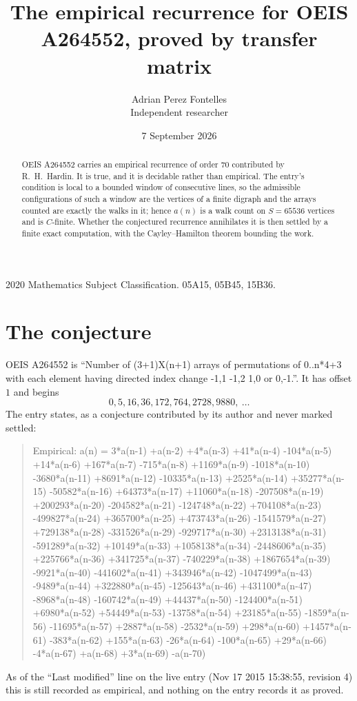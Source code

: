 \documentclass[11pt,a4paper]{article}
\title{The empirical recurrence for OEIS A264552, proved by transfer matrix}
\author{Adrian Perez Fontelles\\ \small Independent researcher}
\date{7 September 2026}
\theoremstyle{plain}
\theoremstyle{definition}
\begin{document}
\maketitle

\begin{abstract}
OEIS A264552 carries an empirical recurrence of order $70$ contributed by R.~H.~Hardin. It is
true, and it is decidable rather than empirical. The entry's condition is local to a bounded window of consecutive lines, so
the admissible configurations of such a window are the vertices of a finite digraph and the
arrays counted are exactly the walks in it; hence $a(n)$ is a walk count on $S=65536$ vertices
and is $C$-finite. Whether the conjectured recurrence annihilates it is then settled by a
finite exact computation, with the Cayley--Hamilton theorem bounding the work.
\end{abstract}

\noindent\small 2020 Mathematics Subject Classification. 05A15, 05B45, 15B36.\normalsize

\section{The conjecture}

OEIS A264552 is ``Number of (3+1)X(n+1) arrays of permutations of 0..n*4+3 with each element having directed index change -1,1 -1,2 1,0 or 0,-1.''. It has offset $1$ and begins
\[
0, 5, 16, 36, 172, 764, 2728, 9880,\ \dots
\]
The entry states, as a conjecture contributed by its author and never marked settled:
\begin{quote}
Empirical: a(n) = 3*a(n-1) +a(n-2) +4*a(n-3) +41*a(n-4) -104*a(n-5) +14*a(n-6) +167*a(n-7) -715*a(n-8) +1169*a(n-9) -1018*a(n-10) -3680*a(n-11) +8691*a(n-12) -10335*a(n-13) +2525*a(n-14) +35277*a(n-15) -50582*a(n-16) +64373*a(n-17) +11060*a(n-18) -207508*a(n-19) +200293*a(n-20) -204582*a(n-21) -124748*a(n-22) +704108*a(n-23) -499827*a(n-24) +365700*a(n-25) +473743*a(n-26) -1541579*a(n-27) +729138*a(n-28) -331526*a(n-29) -929717*a(n-30) +2313138*a(n-31) -591289*a(n-32) +10149*a(n-33) +1058138*a(n-34) -2448606*a(n-35) +225766*a(n-36) +341725*a(n-37) -740229*a(n-38) +1867654*a(n-39) -9921*a(n-40) -441602*a(n-41) +343946*a(n-42) -1047499*a(n-43) -9489*a(n-44) +322880*a(n-45) -125643*a(n-46) +431100*a(n-47) -8968*a(n-48) -160742*a(n-49) +44437*a(n-50) -124400*a(n-51) +6980*a(n-52) +54449*a(n-53) -13758*a(n-54) +23185*a(n-55) -1859*a(n-56) -11695*a(n-57) +2887*a(n-58) -2532*a(n-59) +298*a(n-60) +1457*a(n-61) -383*a(n-62) +155*a(n-63) -26*a(n-64) -100*a(n-65) +29*a(n-66) -4*a(n-67) +a(n-68) +3*a(n-69) -a(n-70)
\end{quote}
As of the ``Last modified'' line on the live entry (Nov 17 2015 15:38:55, revision 4) this is still
recorded as empirical, and nothing on the entry records it as proved.
\end{document}
